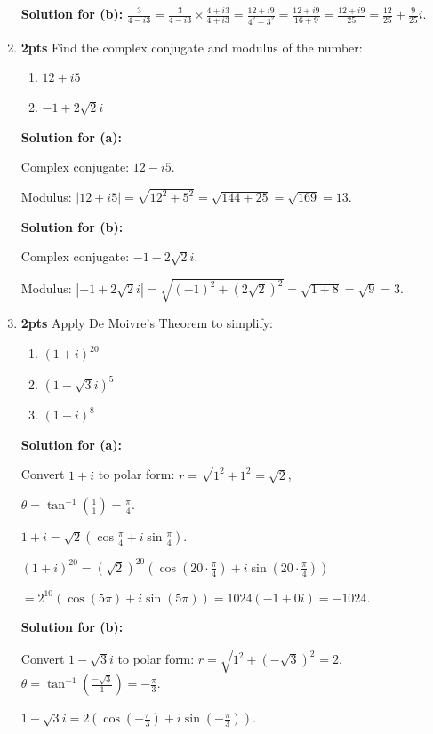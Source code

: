 \documentclass[nohyper,nobib,xcolor=dvipsnames,svgnames,x11names]{tufte-book}
\begin{document}
\begin{enumerate}
    \textbf{Solution for (b):}
    $\frac{3}{4-i3} = \frac{3}{4-i3} \times \frac{4+i3}{4+i3} = \frac{12+i9}{4^2+3^2} = \frac{12+i9}{16+9} = \frac{12+i9}{25} = \frac{12}{25}+\frac{9}{25}i$.

    \item \textbf{2pts} Find the complex conjugate and modulus of the number:
    \begin{enumerate}
        \item $12+i5$
        \item $-1+2\sqrt{2}i$
    \end{enumerate}
    \textbf{Solution for (a):}
    
    Complex conjugate: $12-i5$.
    
    Modulus: $|12+i5| = \sqrt{12^2+5^2} = \sqrt{144+25} = \sqrt{169} = 13$.
    
    \textbf{Solution for (b):}
    
    Complex conjugate: $-1-2\sqrt{2}i$.
    
    Modulus: $|-1+2\sqrt{2}i| = \sqrt{(-1)^2+(2\sqrt{2})^2} = \sqrt{1+8} = \sqrt{9}=3$.

    \item \textbf{2pts} Apply De Moivre's Theorem to simplify:
    \begin{enumerate}
        \item $(1+i)^{20}$
        \item $(1-\sqrt{3}i)^{5}$
        \item $(1-i)^{8}$
    \end{enumerate}

    \textbf{Solution for (a):}
    
    Convert $1+i$ to polar form: $r=\sqrt{1^2+1^2}=\sqrt{2}$, 
    
    $\theta=\tan^{-1}(\frac{1}{1})=\frac{\pi}{4}$.
    
    $1+i = \sqrt{2}(\cos\frac{\pi}{4}+i\sin\frac{\pi}{4})$.
    
    $(1+i)^{20} = (\sqrt{2})^{20}(\cos(20\cdot\frac{\pi}{4})+i\sin(20\cdot\frac{\pi}{4}))$
   
    $= 2^{10}(\cos(5\pi)+i\sin(5\pi)) = 1024(-1+0i) = -1024$.

    \textbf{Solution for (b):}

    Convert $1-\sqrt{3}i$ to polar form: $r=\sqrt{1^2+(-\sqrt{3})^2}=2$, $\theta=\tan^{-1}(\frac{-\sqrt{3}}{1})=-\frac{\pi}{3}$.
    
    $1-\sqrt{3}i = 2(\cos(-\frac{\pi}{3})+i\sin(-\frac{\pi}{3}))$.


\end{enumerate}
\end{document}
